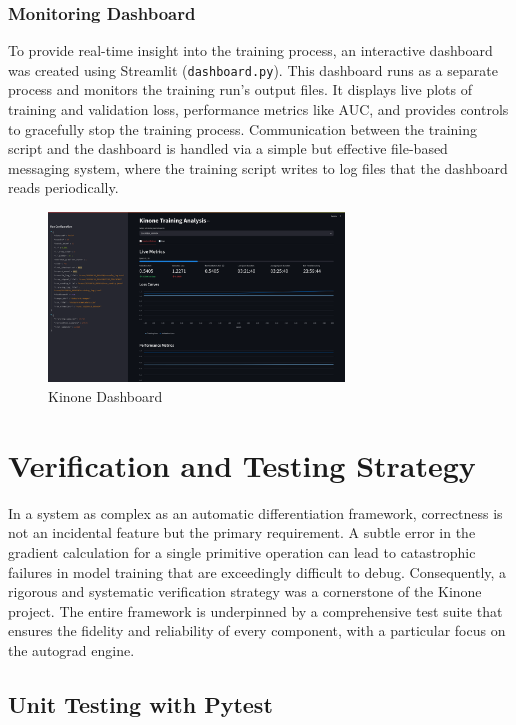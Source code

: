 \documentclass[a4paper]{article}
\begin{document}
\subsubsection{Monitoring Dashboard}
To provide real-time insight into the training process, an interactive dashboard was created using Streamlit (\texttt{dashboard.py}). This dashboard runs as a separate process and monitors the training run's output files. It displays live plots of training and validation loss, performance metrics like AUC, and provides controls to gracefully stop the training process. Communication between the training script and the dashboard is handled via a simple but effective file-based messaging system, where the training script writes to log files that the dashboard reads periodically.

\begin{figure}[t]
  \centering
  \includegraphics[width=0.7\textwidth]{dashboard}
  \caption{Kinone Dashboard}
  \label{fig:kinone_dashboard}
\end{figure}

\section{Verification and Testing Strategy}

In a system as complex as an automatic differentiation framework, correctness is not an incidental feature but the primary requirement. A subtle error in the gradient calculation for a single primitive operation can lead to catastrophic failures in model training that are exceedingly difficult to debug. Consequently, a rigorous and systematic verification strategy was a cornerstone of the Kinone project. The entire framework is underpinned by a comprehensive test suite that ensures the fidelity and reliability of every component, with a particular focus on the autograd engine.

\subsection{Unit Testing with Pytest}
\end{document}
